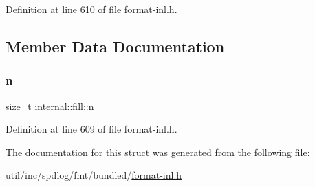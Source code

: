 Definition at line 610 of file format-\/inl.\+h.



\subsection{Member Data Documentation}
\mbox{\label{structinternal_1_1fill_a3ba3938b1d30efc675dd1676d13d3bc2}} 
\subsubsection{\texorpdfstring{n}{n}}
{\footnotesize\ttfamily size\+\_\+t internal\+::fill\+::n}



Definition at line 609 of file format-\/inl.\+h.



The documentation for this struct was generated from the following file\+:\begin{DoxyCompactItemize}
\item 
util/inc/spdlog/fmt/bundled/\hyperlink{format-inl_8h}{format-\/inl.\+h}\end{DoxyCompactItemize}
